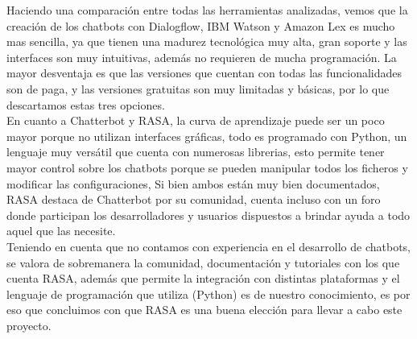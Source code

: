 \indent Haciendo una comparación entre todas las herramientas analizadas, vemos que la creación de
los chatbots con Dialogflow, IBM Watson y Amazon Lex es mucho mas sencilla, ya que tienen una
madurez tecnológica muy alta, gran soporte y las interfaces son muy intuitivas, además no requieren
de mucha programación. La mayor desventaja es que las versiones que cuentan con todas las
funcionalidades son de paga, y las versiones gratuitas son muy limitadas y básicas, por lo que
descartamos estas tres opciones.\\
\indent En cuanto a Chatterbot y RASA, la curva de aprendizaje puede ser un poco mayor porque no
utilizan interfaces gráficas, todo es programado con Python, un lenguaje muy versátil que cuenta
con numerosas librerias, esto permite tener mayor control sobre los chatbots porque se pueden
manipular todos los ficheros y modificar las configuraciones, Si bien ambos están muy bien
documentados, RASA destaca de Chatterbot por su comunidad, cuenta incluso con un foro donde
participan los desarrolladores y usuarios dispuestos a brindar ayuda a todo aquel que las
necesite.\\
\indent Teniendo en cuenta que no contamos con experiencia en el desarrollo de chatbots, se valora
de sobremanera la comunidad, documentación y tutoriales con los que cuenta RASA, además que permite
la integración con distintas plataformas y el lenguaje de programación que utiliza (Python) es de
nuestro conocimiento, es por eso que concluimos con que RASA es una buena elección para llevar a
cabo este proyecto.

